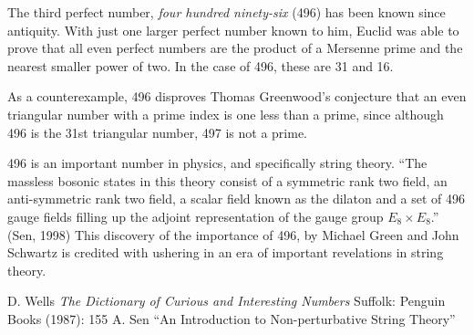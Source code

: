 \documentclass[12pt]{article}
\begin{document}
The third perfect number, {\em four hundred ninety-six} (496) has been known since antiquity. With just one larger perfect number known to him, Euclid was able to prove that all even perfect numbers are the product of a Mersenne prime and the nearest smaller power of two. In the case of 496, these are 31 and 16.

As a counterexample, 496 disproves Thomas Greenwood's conjecture that an even triangular number with a prime index is one less than a prime, since although 496 is the 31st triangular number, 497 is not a prime.

496 is an important number in physics, and specifically string theory. ``The massless bosonic states in this theory consist of a symmetric rank two field, an anti-symmetric rank two field, a scalar field known as the dilaton and a set of 496 gauge fields filling up the adjoint representation of the gauge group $E_8 \times E_8$.'' (Sen, 1998) This discovery of the importance of 496, by Michael Green and John Schwartz is credited with ushering in an era of important revelations in string theory.

\begin{thebibliography}{2}
 D. Wells {\it The Dictionary of Curious and Interesting Numbers} Suffolk: Penguin Books (1987): 155
 A. Sen ``An Introduction to Non-perturbative String Theory'' 
\end{thebibliography}

\end{document}
